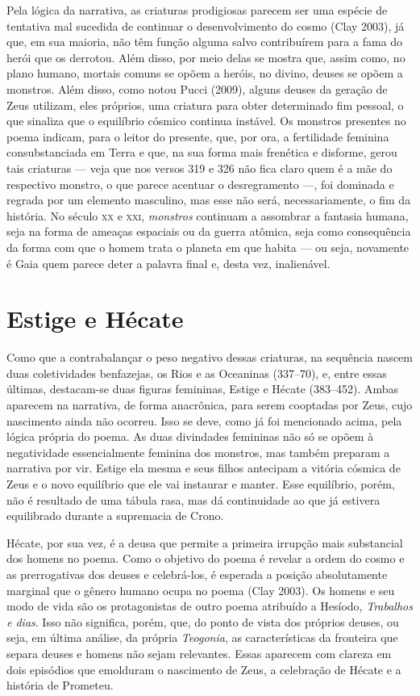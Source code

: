 Pela lógica da narrativa, as criaturas prodigiosas parecem ser uma
espécie de tentativa mal sucedida de continuar o desenvolvimento do
cosmo (Clay 2003), já que, em sua maioria, não têm função alguma salvo
contribuírem para a fama do herói que os derrotou. Além disso, por meio
delas se mostra que, assim como, no plano humano, mortais comuns se
opõem a heróis, no divino, deuses se opõem a monstros. Além disso, como
notou Pucci (2009), alguns deuses da geração de Zeus utilizam, eles
próprios, uma criatura para obter determinado fim pessoal, o que
sinaliza que o equilíbrio cósmico continua instável. Os monstros
presentes no poema indicam, para o leitor do presente, que, por ora, a
fertilidade feminina consubstanciada em Terra e que, na sua forma mais
frenética e disforme, gerou tais criaturas --- veja que nos versos 319 e
326 não fica claro quem é a mãe do respectivo monstro, o que parece
acentuar o desregramento ---, foi dominada e regrada por um elemento
masculino, mas esse não será, necessariamente, o fim da história. No
século \textsc{xx} e \textsc{xxi}, \textit{monstros} continuam a assombrar a fantasia humana,
seja na forma de ameaças espaciais ou da guerra atômica, seja como
consequência da forma com que o homem trata o planeta em que habita ---
ou seja, novamente é Gaia quem parece deter a palavra final e, desta
vez, inalienável.

\section{Estige e Hécate}

Como que a contrabalançar o peso negativo dessas criaturas, na sequência
nascem duas coletividades benfazejas, os Rios e as Oceaninas (337--70),
e, entre essas últimas, destacam-se duas figuras femininas, Estige e
Hécate (383--452). Ambas aparecem na narrativa, de forma anacrônica, para
serem cooptadas por Zeus, cujo nascimento ainda não ocorreu. Isso se
deve, como já foi mencionado acima, pela lógica própria do poema. As
duas divindades femininas não só se opõem à negatividade essencialmente
feminina dos monstros, mas também preparam a narrativa por vir. Estige
ela mesma e seus filhos antecipam a vitória cósmica de Zeus e o novo
equilíbrio que ele vai instaurar e manter. Esse equilíbrio, porém, não é
resultado de uma tábula rasa, mas dá continuidade ao que já estivera
equilibrado durante a supremacia de Crono.

Hécate, por sua vez, é a deusa que permite a primeira irrupção mais
substancial dos homens no poema. Como o objetivo do poema é revelar a
ordem do cosmo e as prerrogativas dos deuses e celebrá-los, é esperada a
posição absolutamente marginal que o gênero humano ocupa no poema (Clay
2003). Os homens e seu modo de vida são os protagonistas de outro poema
atribuído a Hesíodo, \textit{Trabalhos e dias}. Isso não significa, porém,
que, do ponto de vista dos próprios deuses, ou seja, em última análise,
da própria \textit{Teogonia}, as características da fronteira que separa
deuses e homens não sejam relevantes. Essas aparecem com clareza em dois
episódios que emolduram o nascimento de Zeus, a celebração de Hécate e a
história de Prometeu.

